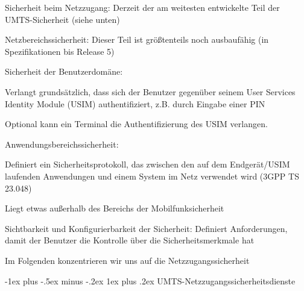 \documentclass[a4paper]{article}
\makeatletter
\renewcommand{\subsubsection}{\@startsection{subsubsection}{3}{0mm}%
 {-1ex plus -.5ex minus -.2ex}%
 {1ex plus .2ex}%
 {\normalfont\small\bfseries}}
\makeatother
\begin{document}
\begin{multicols}{3}
      \begin{itemize*}
            \item Sicherheit beim Netzzugang: Derzeit der am weitesten entwickelte Teil
            der UMTS-Sicherheit (siehe unten)
            \item Netzbereichssicherheit: Dieser Teil ist größtenteils noch ausbaufähig
            (in Spezifikationen bis Release 5)
            \item Sicherheit der Benutzerdomäne:
            \begin{itemize*}
                  \item Verlangt grundsätzlich, dass sich der Benutzer gegenüber seinem User Services Identity Module (USIM) authentifiziert, z.B. durch Eingabe einer PIN
                  \item Optional kann ein Terminal die Authentifizierung des USIM verlangen.
            \end{itemize*}
            \item Anwendungsbereichssicherheit:
            \begin{itemize*}
                  \item Definiert ein Sicherheitsprotokoll, das zwischen den auf dem Endgerät/USIM laufenden Anwendungen und einem System im Netz verwendet wird (3GPP TS 23.048)
                  \item Liegt etwas außerhalb des Bereichs der Mobilfunksicherheit
            \end{itemize*}
            \item Sichtbarkeit und Konfigurierbarkeit der Sicherheit: Definiert
            Anforderungen, damit der Benutzer die Kontrolle über die
            Sicherheitsmerkmale hat
            \item Im Folgenden konzentrieren wir uns auf die Netzzugangssicherheit
      \end{itemize*}


      \subsubsection{UMTS-Netzzugangssicherheitsdienste}


\end{multicols}
\end{document}
